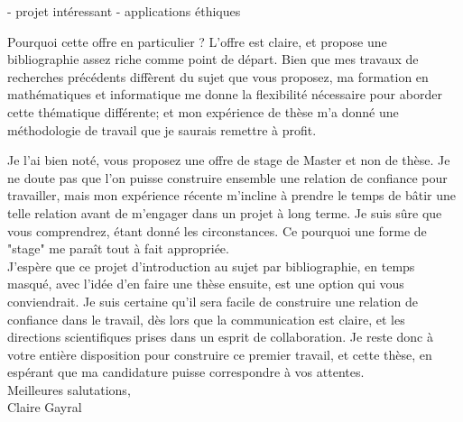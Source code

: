 \documentclass[a4paper,11pt]{article}
\begin{document}
- projet intéressant
- applications éthiques 




Pourquoi cette offre en particulier ?  L'offre est claire, et propose une bibliographie assez riche comme point de départ. Bien que mes travaux de recherches précédents diffèrent du sujet que vous proposez, ma formation en mathématiques et informatique me donne la flexibilité nécessaire pour aborder cette thématique différente; et mon expérience de thèse m'a donné une méthodologie de travail que je saurais remettre à profit. 

Je l'ai bien noté, vous proposez une offre de stage de Master et non de thèse.
Je ne doute pas que l'on puisse construire ensemble une relation de confiance pour travailler, mais mon expérience récente m'incline à prendre le temps de bâtir une telle relation avant de m'engager dans un projet à long terme. Je suis sûre que vous comprendrez, étant donné les circonstances.
Ce pourquoi une forme de "stage" me paraît tout à fait appropriée.  
%
\\
J'espère que ce projet d'introduction au sujet par bibliographie, en temps masqué, avec l'idée d'en faire une thèse ensuite, est une option qui vous conviendrait. 
Je suis certaine qu'il sera facile de construire une relation de confiance dans le travail, dès lors que la communication est claire, et les directions scientifiques prises dans un esprit de collaboration. 
Je reste donc à votre entière disposition pour construire ce premier travail, et cette thèse, en espérant que ma candidature puisse correspondre à vos attentes. \\

Meilleures salutations, \\

Claire Gayral
\end{document}
